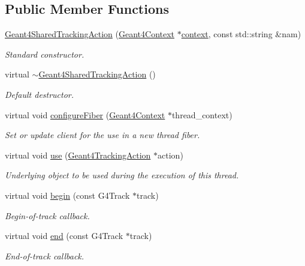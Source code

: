 \subsection*{Public Member Functions}
\begin{DoxyCompactItemize}
\item 
\hyperlink{class_d_d4hep_1_1_simulation_1_1_geant4_shared_tracking_action_a8f1dbd60bd175fa470cee4d29aa392bb}{Geant4\+Shared\+Tracking\+Action} (\hyperlink{class_d_d4hep_1_1_simulation_1_1_geant4_context}{Geant4\+Context} $\ast$\hyperlink{class_d_d4hep_1_1_simulation_1_1_geant4_action_aa9d87f0ec2a72b7fc2591b18f98d75cf}{context}, const std\+::string \&nam)
\begin{DoxyCompactList}\small\item\em Standard constructor. \end{DoxyCompactList}\item 
virtual \hyperlink{class_d_d4hep_1_1_simulation_1_1_geant4_shared_tracking_action_a067e930e8c51e9363ec6cb2bf7163c68}{$\sim$\+Geant4\+Shared\+Tracking\+Action} ()
\begin{DoxyCompactList}\small\item\em Default destructor. \end{DoxyCompactList}\item 
virtual void \hyperlink{class_d_d4hep_1_1_simulation_1_1_geant4_shared_tracking_action_a7033aa446a1fbce97cf260caaf55b5b2}{configure\+Fiber} (\hyperlink{class_d_d4hep_1_1_simulation_1_1_geant4_context}{Geant4\+Context} $\ast$thread\+\_\+context)
\begin{DoxyCompactList}\small\item\em Set or update client for the use in a new thread fiber. \end{DoxyCompactList}\item 
virtual void \hyperlink{class_d_d4hep_1_1_simulation_1_1_geant4_shared_tracking_action_a7810fb89525433a623056dcb8afb5b48}{use} (\hyperlink{class_d_d4hep_1_1_simulation_1_1_geant4_tracking_action}{Geant4\+Tracking\+Action} $\ast$action)
\begin{DoxyCompactList}\small\item\em Underlying object to be used during the execution of this thread. \end{DoxyCompactList}\item 
virtual void \hyperlink{class_d_d4hep_1_1_simulation_1_1_geant4_shared_tracking_action_a67db960b642ca48cc171c0d1296e4125}{begin} (const G4\+Track $\ast$track)
\begin{DoxyCompactList}\small\item\em Begin-\/of-\/track callback. \end{DoxyCompactList}\item 
virtual void \hyperlink{class_d_d4hep_1_1_simulation_1_1_geant4_shared_tracking_action_a35f435a97bbe15def248f21f37847a12}{end} (const G4\+Track $\ast$track)
\begin{DoxyCompactList}\small\item\em End-\/of-\/track callback. \end{DoxyCompactList}\end{DoxyCompactItemize}
